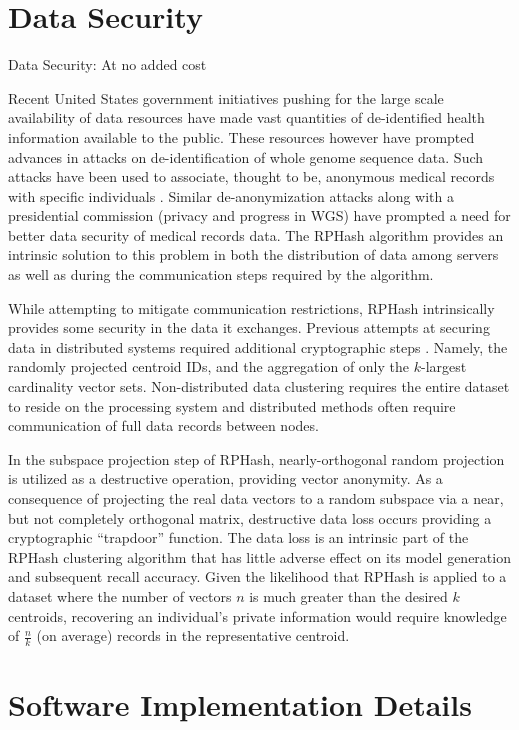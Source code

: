 \section{Data Security}{Data Security: At no added cost}\label{security}

Recent United States government initiatives pushing for the large scale availability of data resources have made vast
quantities of de-identified health information available to the public.  These resources however have prompted advances
in attacks on de-identification of whole genome sequence data.  Such attacks have been used to associate, thought to be,
anonymous medical records with specific individuals \cite{deident}.  Similar de-anonymization attacks
\cite{deanon1,deanon2} along with a presidential commission (privacy and progress in WGS) have prompted a need for
better data security of medical records data.  The \textsf{RPHash} algorithm provides an intrinsic solution to this
problem in both the distribution of data among servers as well as during the communication steps required by the
algorithm.

While attempting to mitigate communication restrictions, \textsf{RPHash} intrinsically provides some security in the data
it exchanges.  Previous attempts at securing data in distributed systems required additional cryptographic steps
\cite{Lindell2000}.  Namely, the randomly projected centroid IDs, and the aggregation of only the $k$-largest cardinality
vector sets.  Non-distributed data clustering requires the entire dataset to reside on the processing system and
distributed methods often require communication of full data records between nodes.

In the subspace projection step of \textsf{RPHash}, nearly-orthogonal random projection is utilized as a destructive
operation, providing vector anonymity.  As a consequence of projecting the real data vectors to a random subspace via a
near, but not completely orthogonal matrix, destructive data loss occurs providing a cryptographic ``trapdoor''
function.  The data loss is an intrinsic part of the \textsf{RPHash} clustering algorithm that has little adverse effect
on its model generation and subsequent recall accuracy.  Given the likelihood that \textsf{RPHash} is applied to a dataset where
the number of vectors $n$ is much greater than the desired $k$ centroids, recovering an individual's private information
would require knowledge of $\frac{n}{k}$ (on average) records in the representative centroid.

\section{Software Implementation Details}

